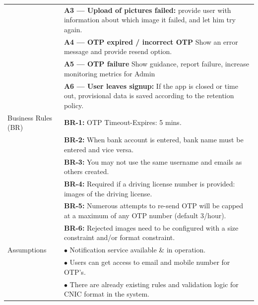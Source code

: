 \begin{longtable}{|>{\raggedright\arraybackslash}p{4cm}|>{\raggedright\arraybackslash}p{11cm}|}
& \textbf{A3 — Upload of pictures failed:} \newline provide user with information about which image it failed, and let him try again. \\
& \textbf{A4 — OTP expired / incorrect OTP} \newline Show an error message and provide resend option. \\
& \textbf{A5 — OTP failure} \newline Show guidance, report failure, increase monitoring metrics for Admin \\
& \textbf{A6 — User leaves signup:} \newline If the app is closed or time out, provisional data is saved according to the retention policy. \\
\hline
Business Rules (BR) & \textbf{BR-1:} OTP Timeout-Expires: 5 mins. \\
& \textbf{BR-2:} When bank account is entered, bank name must be entered and vice versa. \\
& \textbf{BR-3:} You may not use the same username and emails as others created. \\
& \textbf{BR-4:} Required if a driving license number is provided: images of the driving license. \\
& \textbf{BR-5:} Numerous attempts to re-send OTP will be capped at a maximum of any OTP number (default 3/hour). \\
& \textbf{BR-6:} Rejected images need to be configured with a size constraint and/or format constraint. \\
\hline
Assumptions & $\bullet$ Notification service available \& in operation. \\
& $\bullet$ Users can get access to email and mobile number for OTP's. \\
& $\bullet$ There are already existing rules and validation logic for CNIC format in the system. \\
\end{longtable}

